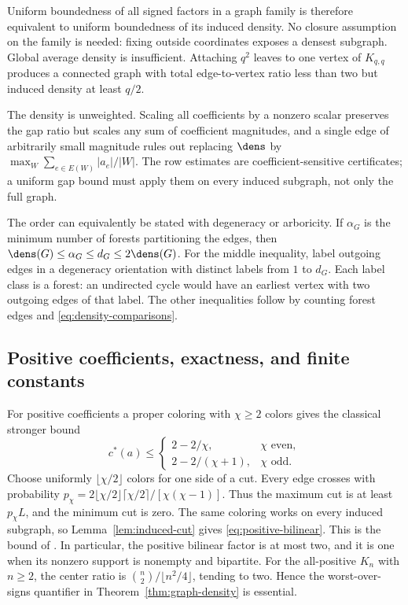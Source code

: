 Uniform boundedness of all signed factors in a graph family is therefore
equivalent to uniform boundedness of its induced density. No closure
assumption on the family is needed: fixing outside coordinates exposes a
densest subgraph. Global average density is insufficient. Attaching $q^2$
leaves to one vertex of $K_{q,q}$ produces a connected graph with total
edge-to-vertex ratio less than two but induced density at least $q/2$.

The density is unweighted. Scaling all coefficients by a nonzero scalar
preserves the gap ratio but scales any sum of coefficient magnitudes, and a
single edge of arbitrarily small magnitude rules out replacing $\dens$ by
$\max_W\sum_{e\in E(W)}|a_e|/|W|$. The row estimates are
coefficient-sensitive certificates; a uniform gap bound must apply them on
every induced subgraph, not only the full graph.

The order can equivalently be stated with degeneracy or arboricity.
If $\alpha_G$ is the minimum number of forests partitioning the edges,
then $\dens(G)\le\alpha_G\le d_G\le2\dens(G)$. For the middle inequality,
label outgoing edges in a degeneracy orientation with distinct labels
from $1$ to $d_G$. Each label class is a forest: an undirected cycle would
have an earliest vertex with two outgoing edges of that label. The other
inequalities follow by counting forest edges and
\eqref{eq:density-comparisons}.

\subsection{Positive coefficients, exactness, and finite constants}
For positive coefficients a proper coloring with $\chi\ge2$ colors gives
the classical stronger bound
\begin{equation}\label{eq:positive-bilinear}
 c^*(a)\le
 \begin{cases}2-2/\chi,&\chi\text{ even},\\
 2-2/(\chi+1),&\chi\text{ odd}.
 \end{cases}
\end{equation}
Choose uniformly $\lfloor\chi/2\rfloor$ colors for one side of a cut.
Every edge crosses with probability
$p_\chi=2\lfloor\chi/2\rfloor\lceil\chi/2\rceil/[\chi(\chi-1)]$.
Thus the maximum cut is at least $p_\chi L$, and the minimum cut is zero.
The same coloring works on every induced subgraph, so
Lemma~\ref{lem:induced-cut} gives \eqref{eq:positive-bilinear}.
This is the bound of \citet[Theorem 8 in the authors' manuscript]{Luedtke2012}.
In particular, the positive bilinear factor is at most two, and it is one
when its nonzero support is nonempty and bipartite. For the all-positive $K_n$
with $n\ge2$, the center ratio is
$\binom n2/\lfloor n^2/4\rfloor$, tending to two. Hence the worst-over-signs
quantifier in Theorem~\ref{thm:graph-density} is essential.

